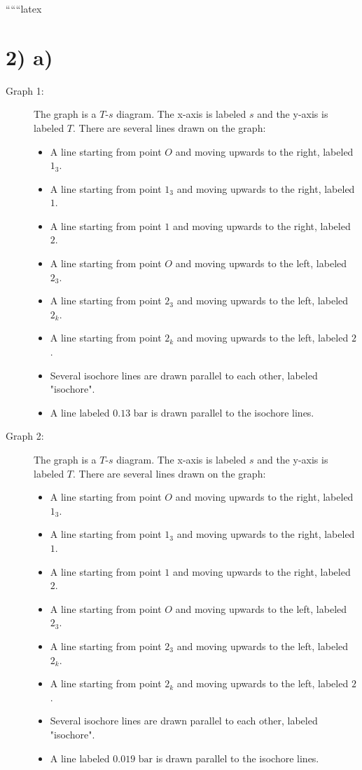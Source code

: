 
``````latex


\section*{2) a)}

\begin{description}
    \item[Graph 1:] The graph is a $T$-$s$ diagram. The x-axis is labeled $s$ and the y-axis is labeled $T$. There are several lines drawn on the graph:
    \begin{itemize}
        \item A line starting from point $O$ and moving upwards to the right, labeled $1_3$.
        \item A line starting from point $1_3$ and moving upwards to the right, labeled $1$.
        \item A line starting from point $1$ and moving upwards to the right, labeled $2$.
        \item A line starting from point $O$ and moving upwards to the left, labeled $2_3$.
        \item A line starting from point $2_3$ and moving upwards to the left, labeled $2_k$.
        \item A line starting from point $2_k$ and moving upwards to the left, labeled $2$.
        \item Several isochore lines are drawn parallel to each other, labeled "isochore".
        \item A line labeled $0.13 \text{ bar}$ is drawn parallel to the isochore lines.
    \end{itemize}
    
    \item[Graph 2:] The graph is a $T$-$s$ diagram. The x-axis is labeled $s$ and the y-axis is labeled $T$. There are several lines drawn on the graph:
    \begin{itemize}
        \item A line starting from point $O$ and moving upwards to the right, labeled $1_3$.
        \item A line starting from point $1_3$ and moving upwards to the right, labeled $1$.
        \item A line starting from point $1$ and moving upwards to the right, labeled $2$.
        \item A line starting from point $O$ and moving upwards to the left, labeled $2_3$.
        \item A line starting from point $2_3$ and moving upwards to the left, labeled $2_k$.
        \item A line starting from point $2_k$ and moving upwards to the left, labeled $2$.
        \item Several isochore lines are drawn parallel to each other, labeled "isochore".
        \item A line labeled $0.019 \text{ bar}$ is drawn parallel to the isochore lines.
    \end{itemize}
\end{description}

